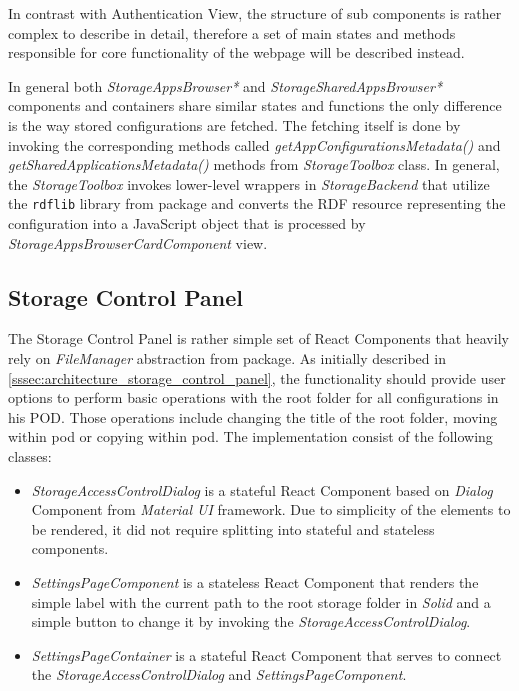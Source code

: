 In contrast with Authentication View, the structure of sub components is rather complex to describe in detail, therefore a set of main states and methods responsible for core functionality of the webpage will be described instead.

In general both \textit{StorageAppsBrowser*} and \textit{StorageSharedAppsBrowser*} components and containers share similar states and functions the only difference is the way stored \lpa{} configurations are fetched. The fetching itself is done by invoking the corresponding methods called \textit{getAppConfigurationsMetadata()} and \textit{getSharedApplicationsMetadata()} methods from \textit{StorageToolbox} class. In general, the \textit{StorageToolbox} invokes lower-level wrappers in \textit{StorageBackend} that utilize the \texttt{rdflib} library from \lpas{} package and converts the RDF resource representing the \lpa{} configuration into a JavaScript object that is processed by \textit{StorageAppsBrowserCardComponent} view.

\subsection{Storage Control Panel}
\label{sssec:storage_control_panel_implementation}

The Storage Control Panel is rather simple set of React Components that heavily rely on \textit{FileManager} abstraction from \lpas{} package. As initially described in \autoref{sssec:architecture_storage_control_panel}, the functionality should provide user options to perform basic operations with the root folder for all \lpa{} configurations in his \solid{} POD. Those operations include changing the title of the root folder, moving within pod or copying within pod. The implementation consist of the following classes:
\begin{itemize}
	\item \textit{StorageAccessControlDialog} is a stateful React Component based on \textit{Dialog} Component from \textit{Material UI} framework. Due to simplicity of the elements to be rendered, it did not require splitting into stateful and stateless components.
	\item \textit{SettingsPageComponent} is a stateless React Component that renders the simple label with the current path to the root storage folder in \textit{Solid} and a simple button to change it by invoking the \textit{StorageAccessControlDialog}.
	\item \textit{SettingsPageContainer} is a stateful React Component that serves to connect the \textit{StorageAccessControlDialog} and \textit{SettingsPageComponent}.
\end{itemize}

